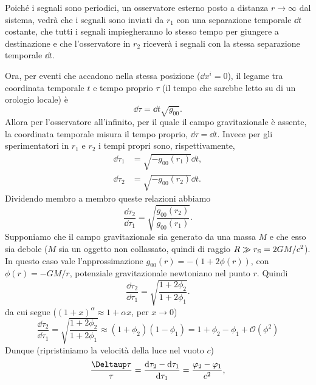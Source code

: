 Poiché i segnali sono periodici, un osservatore esterno posto a distanza $r \to
\infty$ dal sistema, vedrà che i segnali sono inviati da $r_{1}$ con una
separazione temporale $\dd t$ costante, che tutti i segnali impiegheranno lo
stesso tempo per giungere a destinazione e che l'osservatore in $r_2$ riceverà i
segnali con la stessa separazione temporale $\dd t$.

Ora, per eventi che accadono nella stessa posizione ($\dd x^i=0$), il legame tra
coordinata temporale $t$ e tempo proprio $\tau$ (il tempo che sarebbe letto su
di un orologio locale) è
\begin{equation}
  \dd \tau = \dd t \sqrt{g_{00}}.
\end{equation}
Allora per l'osservatore all'infinito, per il quale il campo gravitazionale è
assente, la coordinata temporale misura il tempo proprio, $\dd\tau = \dd t$.
Invece per gli sperimentatori in $r_{1}$ e $r_{2}$ i tempi propri sono,
rispettivamente,
\begin{subequations}
  \begin{align}
    \dd\tau_{1} &= \sqrt{-g_{00}(r_{1})} \dd t, \\
    \dd\tau_{2} &= \sqrt{-g_{00}(r_{2})} \dd t.
  \end{align}
\end{subequations}
Dividendo membro a membro queste relazioni abbiamo
\begin{equation}
  \frac{\dd \tau_{2}}{\dd \tau_{1}} =
  \sqrt{\frac{g_{00}(r_{2})}{g_{00}(r_{1})}}.
\end{equation}
Supponiamo che il campo gravitazionale sia generato da una massa $M$ e che esso
sia debole ($M$ sia un oggetto non collassato, quindi di raggio $ R \gg
r_{\textup{S}} = 2GM/c^2$).  In questo caso vale l'approssimazione $g_{00}(r) =
-(1 + 2\phi(r))$, con $\phi(r)=-GM/r$, potenziale gravitazionale newtoniano nel
punto $r$.  Quindi
\begin{equation}
  \frac{\dd\tau_{2}}{\dd\tau_{1}} = \sqrt{\frac{1 + 2\phi_{2}}{1 + 2\phi_{1}}}.
\end{equation}
da cui segue ($(1+x)^{\alpha} \approx 1 + \alpha x$, per $x \to 0$)
\begin{equation}
  \frac{\dd \tau_{2}}{\dd \tau_{1}} =
  \sqrt{\frac{1 + 2\phi_{2}}{1 + 2\phi_{1}}} \approx (1 + \phi_{2}) (1 -
  \phi_{1}) = 1 + \phi_{2} - \phi_{1} + \mathcal{O}(\phi^{2}) 
\end{equation}
Dunque (ripristiniamo la velocità della luce nel vuoto $c$)
\begin{equation}
  \frac{\var\tau}{\tau} = \frac{\dd\tau_{2} - \dd\tau_{1}}{\dd\tau_{1}} =
  \frac{\phi_{2} - \phi_{1}}{c^{2}},
\end{equation}
